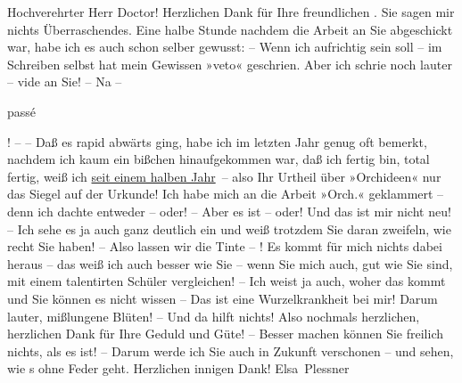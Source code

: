 \pstart{}Hochverehrter Herr Doctor!\pend\vspace{0.5em}
\pstart
           Herzlichen Dank für Ihre freundlichen \label{K_L03711-1v}\label{K_L03711-1}. Sie
               sagen mir nichts Überraschendes. Eine halbe Stunde nachdem die Arbeit an Sie abgeschickt war, habe ich es
               auch schon selber gewusst: – Wenn ich aufrichtig sein soll – im Schreiben selbst hat
               mein Gewissen »veto« geschrien. Aber ich schrie noch
               lauter – vide{ }\label{K_L03711-2v}\label{K_L03711-2} an Sie! – Na – \begin{otherlanguage}{french}passé\end{otherlanguage}! – – Daß es rapid abwärts ging, habe ich im
                  letzten Jahr genug oft bemerkt, nachdem ich kaum ein bißchen hinaufgekommen
               war, daß ich fertig bin, total fertig, weiß ich {\pb}\uline{seit einem halben Jahr} – also Ihr Urtheil über »Orchideen« nur das Siegel auf der Urkunde! Ich
               habe mich an die Arbeit \introOben{}»Orch.«\introOben{} geklammert – denn ich dachte entweder – oder! – Aber es ist
               – oder! Und das ist mir nicht neu! – Ich sehe es ja auch ganz deutlich ein und weiß
               trotzdem Sie daran zweifeln, wie recht Sie haben! – Also lassen wir die Tinte – ! Es
               kommt für mich nichts dabei heraus – das weiß ich auch besser wie Sie – wenn Sie {\pb}mich auch, gut wie Sie sind, mit einem talentirten Schüler vergleichen! –
               Ich weist ja auch, woher das kommt und Sie können es nicht wissen – Das ist eine
               Wurzelkrankheit bei mir! Darum lauter, mißlungene Blüten! – Und da hilft nichts! Also
               nochmals herzlichen, herzlichen Dank für Ihre Geduld und Güte! – Besser machen können
               Sie freilich nichts, als es ist! – Darum werde ich Sie auch in Zukunft verschonen –
               und sehen, wie s ohne Feder geht. Herzlichen innigen Dank!\pend
           \pstart \spacefill\mbox{Elsa Plessner}\pend{}\endnumbering{}
\begin{anhang}
\end{anhang}
      